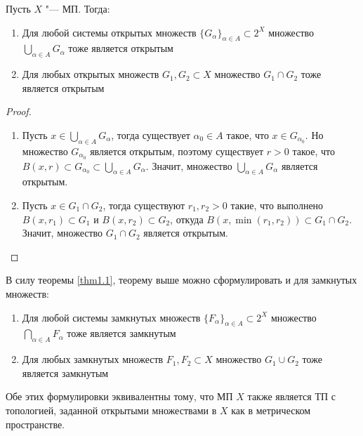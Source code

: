 \begin{theorem}\label{thm1.2}
	Пусть $X$ "--- МП. Тогда:
	\begin{enumerate}
		\item Для любой системы открытых множеств $\{G_\alpha\}_{\alpha \in  A} \subset 2^X$ множество $\bigcup\limits_{\alpha \in  A} G_{\alpha}$ тоже является открытым

		\item Для любых открытых множеств $G_1, G_2 \subset X$ множество $G_1 \cap G_2$ тоже является открытым
	\end{enumerate}
\end{theorem}

\begin{proof}~
	\begin{enumerate}
		\item Пусть $x \in \bigcup\limits_{\alpha \in  A} G_\alpha$, тогда существует $\alpha_0 \in  A$ такое, что $x \in G_{\alpha_0}$. Но множество $G_{\alpha_0}$ является открытым, поэтому существует $r > 0$ такое, что $B(x, r) \subset G_{\alpha_0} \subset \bigcup\limits_{\alpha \in  A} G_{\alpha}$. Значит, множество $\bigcup\limits_{\alpha \in  A} G_{\alpha}$ является открытым.

		\item Пусть $x \in G_1 \cap G_2$, тогда существуют $r_1, r_2 > 0$ такие, что выполнено $B(x, r_1) \subset G_1$ и $B(x, r_2) \subset G_2$, откуда $B(x, \min(r_1, r_2)) \subset G_1 \cap G_2$. Значит, множество $G_1 \cap G_2$ является открытым.\qedhere
	\end{enumerate}
\end{proof}

\begin{note}
	В силу теоремы \ref{thm1.1}, теорему выше можно сформулировать и для замкнутых множеств:
	\begin{enumerate}
		\item Для любой системы замкнутых множеств $\{F_\alpha\}_{\alpha \in  A} \subset 2^X$ множество $\bigcap\limits_{\alpha \in  A} F_{\alpha}$ тоже является замкнутым

		\item Для любых замкнутых множеств $F_1, F_2 \subset X$ множество $G_1 \cup G_2$ тоже является замкнутым
	\end{enumerate}

	Обе этих формулировки эквивалентны тому, что МП $X$ также является ТП с топологией, заданной открытыми множествами в $X$ как в метрическом пространстве.
\end{note}

